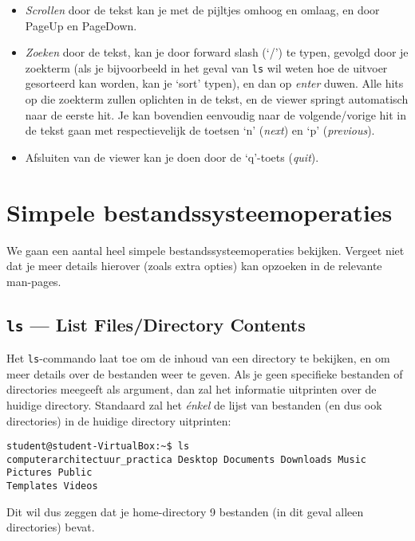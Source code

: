 \documentclass[a4paper,twoside,openany]{memoir}
\begin{document}
\begin{itemize}

  \item \emph{Scrollen} door de tekst kan je met de pijltjes omhoog en omlaag,
    en door PageUp en PageDown.

  \item \emph{Zoeken} door de tekst, kan je door forward slash (`/') te typen,
    gevolgd door je zoekterm (als je bijvoorbeeld in het geval van \verb!ls! wil
    weten hoe de uitvoer gesorteerd kan worden, kan je `sort' typen), en dan op
    \emph{enter} duwen. Alle hits op die zoekterm zullen oplichten in de tekst,
    en de viewer springt automatisch naar de eerste hit. Je kan bovendien
    eenvoudig naar de volgende/vorige hit in de tekst gaan met respectievelijk
    de toetsen `n' (\emph{next}) en `p' (\emph{previous}).

  \item {Afsluiten} van de viewer kan je doen door de `q'-toets (\emph{quit}).

\end{itemize}

\chapter{Simpele bestandssysteemoperaties}

We gaan een aantal heel simpele bestandssysteemoperaties bekijken. Vergeet niet
dat je meer details hierover (zoals extra opties) kan opzoeken in de relevante
man-pages.

\section{\texttt{ls} --- List Files/Directory Contents}

Het \verb!ls!-commando laat toe om de inhoud van een directory te bekijken, en
om meer details over de  bestanden weer te geven. Als je geen specifieke
bestanden of directories meegeeft als argument, dan zal het informatie
uitprinten over de huidige
directory. Standaard zal het \emph{énkel} de lijst van bestanden (en dus ook
directories) in de huidige directory uitprinten:

\begin{verbatim}
student@student-VirtualBox:~$ ls
computerarchitectuur_practica Desktop Documents Downloads Music Pictures Public
Templates Videos
\end{verbatim}

Dit wil dus zeggen dat je home-directory 9 bestanden (in dit geval alleen
directories) bevat.
\end{document}
